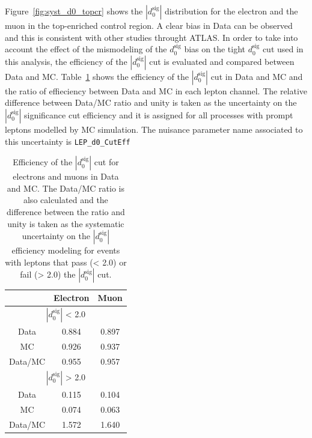 Figure~\ref{fig:syst_d0_topcr} shows the $|d_{0}^{\textrm{sig}}|$ distribution for the electron and the muon in the top-enriched control region. A clear bias
in Data can be observed and this is consistent with other studies throught ATLAS. In order to take into account the effect of the mismodeling of the $d_{0}^{\textrm{sig}}$
bias on the tight $d_{0}^{\textrm{sig}}$ cut used in this analysis, the efficiency of the $|d_{0}^{\textrm{sig}}|$ cut is evaluated and compared between Data and MC.
Table~\ref{tab:syst_d0_topcr_eff_datamc} shows the efficiency of the $|d_{0}^{\textrm{sig}}|$ cut in Data and MC and the ratio of effieciency between Data and MC in each
lepton channel. The relative difference between Data/MC ratio and unity is taken as the uncertainty on the $|d_{0}^{\textrm{sig}}|$ significance cut efficiency
and it is assigned for all processes with prompt leptons modelled by MC simulation. The nuisance parameter name associated to this uncertainty is \texttt{LEP\_d0\_CutEff}
 
\begin{table}[!htbp]
\begin{center}
\begin{tabular}{c|c|c}
&  Electron  & Muon  \\  
\hline
\multicolumn{3}{c}{$|d_{0}^{\textrm{sig}}|$ < 2.0} \\
\hline
Data                &  0.884  & 0.897 \\
MC                  &  0.926  & 0.937 \\
\hline
Data/MC             &  0.955  & 0.957 \\
\hline
\hline
\multicolumn{3}{c}{$|d_{0}^{\textrm{sig}}|$ > 2.0} \\
\hline
Data                &  0.115  & 0.104  \\
MC                  &  0.074  & 0.063  \\
\hline
Data/MC             &  1.572  & 1.640  \\
\end{tabular}
\end{center}
\caption[Efficiency of the $|d_{0}^{\textrm{sig}}|$ cut for electrons and muons in Data
and MC]{Efficiency of the $|d_{0}^{\textrm{sig}}|$ cut for electrons and muons in Data
and MC. The Data/MC ratio is also calculated and the difference between the ratio and unity
is taken as the systematic uncertainty on the $|d_{0}^{\textrm{sig}}|$ efficiency modeling
for events with leptons that pass (< 2.0) or fail (> 2.0) the $|d_{0}^{\textrm{sig}}|$ cut.}
\label{tab:syst_d0_topcr_eff_datamc}
\end{table}
 
